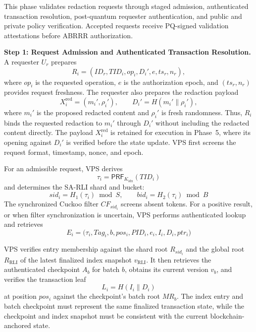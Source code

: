 \documentclass[lettersize,journal]{IEEEtran}
\begin{document}
    This phase validates redaction requests through staged
    admission, authenticated transaction resolution,
    post-quantum requester authentication, and public
    and private policy verification. Accepted requests
    receive PQ-signed validation attestations before
    ABRRR authorization.
    
    \medskip
    \noindent\textbf{Step 1: Request Admission and
    Authenticated Transaction Resolution.}
    A requester $U_r$ prepares
    \begin{equation}
    R_i=(ID_r,TID_i,op_i,D_i',e,ts_r,n_r),
    \end{equation}
    where $op_i$ is the requested operation, $e$ is the
    authorization epoch, and $(ts_r,n_r)$ provides request
    freshness. The requester also prepares the redaction payload
    \begin{equation}
    X_i^{\mathrm{red}}=(m_i',\rho_i'),
    \qquad
    D_i'=H(m_i'\parallel\rho_i'),
    \end{equation}
    where $m_i'$ is the proposed redacted content and $\rho_i'$
    is fresh randomness. Thus, $R_i$ binds the requested
    redaction to $m_i'$ through $D_i'$ without including the
    redacted content directly. The payload $X_i^{\mathrm{red}}$
    is retained for execution in Phase~5, where its opening
    against $D_i'$ is verified before the state update.
    VPS first screens the request format, timestamp, nonce,
    and epoch.
    
    For an admissible request, VPS derives
    \begin{equation}
    \tau_i=\mathsf{PRF}_{K_{\mathrm{idx}}}(TID_i)
    \end{equation}
    and determines the SA-RLI shard and bucket:
    \begin{equation}
    sid_i=H_1(\tau_i)\bmod S,
    \qquad
    bid_i=H_2(\tau_i)\bmod B
    \end{equation}
    The synchronized Cuckoo filter $CF_{sid_i}$
    screens absent tokens. For a positive result,
    or when filter synchronization is uncertain,
    VPS performs authenticated lookup and retrieves
    \begin{equation}
    E_i=\big(\tau_i,Tag_i,b,pos_i,PID_i,e_i,I_i,D_i,ptr_i\big)
    \end{equation}
    
    VPS verifies entry membership against the shard
    root $R_{sid_i}$ and the global root
    $R_{\mathrm{RLI}}$ of the latest finalized index
    snapshot $v_{\mathrm{RLI}}$. It then retrieves
    the authenticated checkpoint $A_b$ for batch
    $b$, obtains its current version $v_b$, and
    verifies the transaction leaf
    \begin{equation}
    L_i=H(I_i\parallel D_i)
    \end{equation}
    at position $pos_i$ against the checkpoint's
    batch root $MR_b$. The index entry and batch
    checkpoint must represent the same finalized
    transaction state, while the checkpoint and
    index snapshot must be consistent with the
    current blockchain-anchored state.
    
\end{document}
